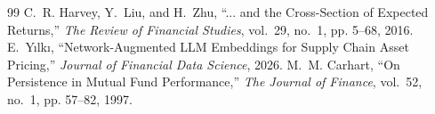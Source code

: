 \documentclass[10pt,journal,compsoc]{IEEEtran}
\begin{document}
\begin{thebibliography}{99}
C.~R. Harvey, Y.~Liu, and H.~Zhu, ``... and the Cross-Section of Expected Returns,'' \emph{The Review of Financial Studies}, vol.~29, no.~1, pp. 5--68, 2016.
E.~Y{\i}lk{\i}, ``Network-Augmented LLM Embeddings for Supply Chain Asset Pricing,'' \emph{Journal of Financial Data Science}, 2026.
M.~M. Carhart, ``On Persistence in Mutual Fund Performance,'' \emph{The Journal of Finance}, vol.~52, no.~1, pp. 57--82, 1997.
\end{thebibliography}
\end{document}
